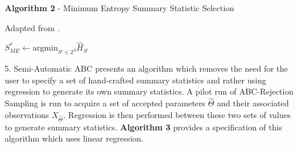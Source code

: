 \documentclass[ %
                  author={Dominic Hutchinson},
                supervisor={Dr. Daniel Lawson \& Dr. Sam Tickle},
                    degree={MEng Maths and Computer Science},
                     title={Bayesian Modelling of Epidemic Events},
                  subtitle={Summary Statistic Selection for Approximate Bayesian Computation Methods},
                      type={},
                      year={2021}
               ]{poster}
\begin{document}
\begin{frame}{}
\begin{columns}[t]
\begin{column}{0.475\linewidth}
      \begin{block}{\footnotesize \textbf{Algorithm 2} - Minimum Entropy Summary Statistic Selection}
        {\footnotesize
          Adapted from \cite[]{on_optimal_selection_of_summary_stats_for_ABC}.
          \par
          \begin{algorithm}[H]\label{alg_me}
            $S_{ME}^*\leftarrow\text{argmin}_{S'\in 2^S}\hat{H}_{S'}$\\
          \end{algorithm}
        }
      \end{block}

      \begin{block}{\Large 5. Semi-Automatic ABC}
        \cite[]{constructing_summary_statistics_for_approximate_bayesian_computation_semi_automatic_ABC} presents an algorithm which removes the need for the user to specify a set of hand-crafted summary statistics and rather using regression to generate its own summary statistics. A pilot run of ABC-Rejection Sampling is run to acquire a set of accepted parameters $\hat\Theta$ and their associated observations $X_{\hat\Theta}$. Regression is then performed between these two sets of values to generate summary statistics. \textbf{Algorithm 3} provides a specification of this algorithm which uses linear regression.
      \end{block}


\end{column}
\end{columns}
\end{frame}
\end{document}
